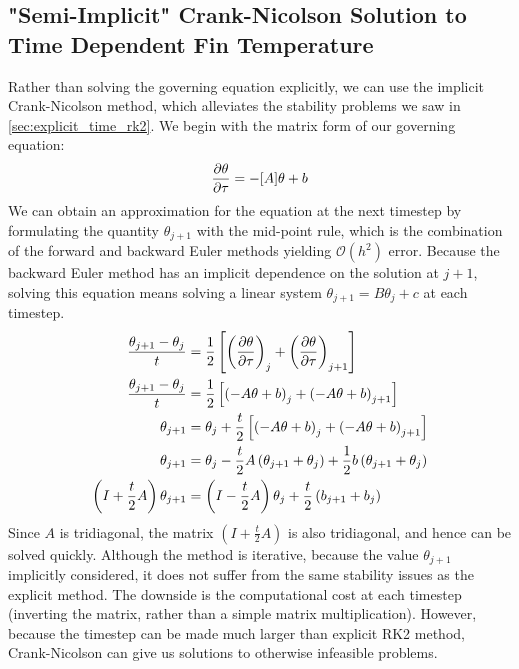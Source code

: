 \documentclass[10pt,letterpaper,notitlepage]{article}
\begin{document}
    \subsection{"Semi-Implicit" Crank-Nicolson Solution to Time Dependent Fin Temperature}
    \label{sec:implicit}
    Rather than solving the governing equation explicitly, we can use the implicit Crank-Nicolson method, which alleviates the stability problems we saw in \cref{sec:explicit_time_rk2}. We begin with the matrix form of our governing equation:
    \begin{equation*}
        \pdv{\theta}{\tau} = -[A] \theta + b
    \end{equation*}
    We can obtain an approximation for the equation at the next timestep by formulating the quantity $\theta_{j+1}$ with the mid-point rule, which is the combination of the forward and backward Euler methods yielding $\mathcal{O}(h^2)$ error. Because the backward Euler method has an implicit dependence on the solution at $j+1$, solving this equation means solving a linear system $\theta_{j+1} = B \theta_{j} + c$ at each timestep.
    \begin{align}
        \frac{\theta_{j+1} - \theta_{j}}{t} &= \frac{1}{2} \left[ \left(\pdv{\theta}{\tau}\right)_{j} +  \left(\pdv{\theta}{\tau}\right)_{j+1}\right] \\
        \frac{\theta_{j+1} - \theta_{j}}{t} &= \frac{1}{2} \left[ \left(-A \theta + b\right)_{j} + \left(-A \theta + b\right)_{j+1} \right] \\
        \theta_{j+1} &= \theta_{j} + \frac{t}{2} \left[ \left(-A \theta + b\right)_{j} + \left(-A \theta + b\right)_{j+1} \right] \\
        \theta_{j+1} &= \theta_{j} - \frac{t}{2} A \left( \theta_{j+1} + \theta_{j} \right) + \frac{1}{2} b \left( \theta_{j+1} + \theta_{j} \right) \\
        \left( I + \frac{t}{2}  A \right) \theta_{j+1} &= \left( I - \frac{t}{2} A \right) \theta_{j} + \frac{t}{2} \left( b_{j+1} + b_{j} \right)
        \label{eq:cn}
    \end{align}
    Since $A$ is tridiagonal, the matrix $\left( I + \frac{t}{2}  A \right)$ is also tridiagonal, and hence can be solved quickly. Although the method is iterative, because the value $\theta_{j+1}$ implicitly considered, it does not suffer from the same stability issues as the explicit method. The downside is the computational cost at each timestep (inverting the matrix, rather than a simple matrix multiplication). However, because the timestep can be made much larger than explicit RK2 method, Crank-Nicolson can give us solutions to otherwise infeasible problems.
\end{document}
